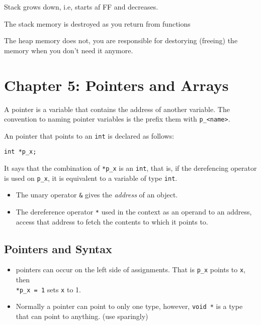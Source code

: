 \documentclass[12pt]{article}
\begin{document}

Stack grows down, i.e, starts af FF and decreases.

The stack memory is destroyed as you return from functions

The heap memory does not, you are responsible for destorying (freeing) the memory when you don't need it anymore.


\section*{Chapter 5: Pointers and Arrays}
\begin{definition}[Pointer]
    A pointer is a variable that contains the address of another variable. The convention to naming pointer variables is the prefix them with \lstinline|p_<name>|.

    An pointer that points to an \lstinline|int| is declared as follows:

    \lstinline{int *p_x;}

    It says that the combination of \lstinline|*p_x| is an \lstinline|int|, that is, if the derefencing operator is used on \lstinline|p_x|, it is equivalent to a variable of type \lstinline|int|.
\end{definition}


\begin{itemize}
    \item The unary operator \lstinline|&| gives the \emph{address} of an object.
    \item The dereference operator \lstinline|*| used in the context as an operand to an address, access that address to fetch the contents to which it points to.
\end{itemize}






\subsection*{Pointers and Syntax}
\begin{itemize}
    \item pointers can occur on the left side of assignments. That is \lstinline{p_x} points to \lstinline{x}, then \\ \lstinline{*p_x = 1} sets \lstinline{x} to 1.
    \item Normally a pointer can point to only one type, however, \lstinline{void *} is a type that can point to anything. (use sparingly)
\end{itemize}
\end{document}
